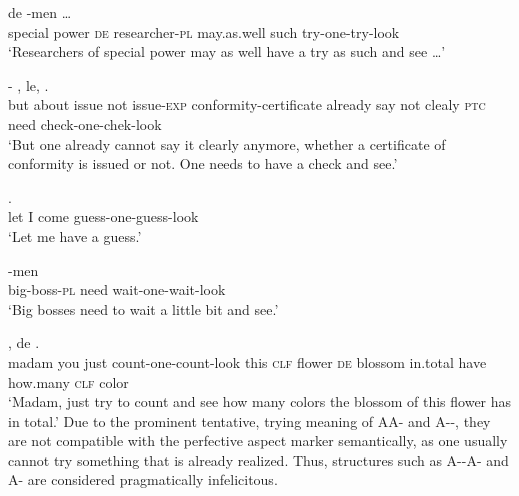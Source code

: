\begin{sloppypar}
\ea\label{ex:AyiAkan}
\ea
\gll {}  de -men    \ldots\\
special power \textsc{de} researcher-\textsc{pl} may.as.well such try-one-try-look\\ 
\glt `Researchers of special power may as well have a try as such and see \ldots'

\ex 
\gll {}    - ,     le,  .\\
but about issue not issue-\textsc{exp} conformity-certificate already say not clealy \textsc{ptc} need check-one-chek-look\\ 
\glt `But one already cannot say it clearly anymore, whether a certificate of conformity is issued or not. One needs to have a check and see.'

\ex
\gll {}   .\\
let I come guess-one-guess-look\\ 
\glt `Let me have a guess.'

\ex
\gll {}-men  \\
big-boss-\textsc{pl} need wait-one-wait-look\\ 
\glt `Big bosses need to wait a little bit and see.'

\ex
\gll {}   ,    de      .\\
madam you just count-one-count-look this \textsc{clf} flower \textsc{de} blossom in.total have how.many \textsc{clf} color\\ 
\glt `Madam, just try to count and see how many colors the blossom of this flower has in total.'
\z
\z
Due to the prominent tentative, trying meaning of AA- and A--, they are not compatible with the perfective aspect marker  semantically,
as one usually cannot try something that is already realized.
Thus, structures such as  A\hyp{}\hyp{}A\hyp{} and A\hyp{} are considered pragmatically infelicitous.
\end{sloppypar}

